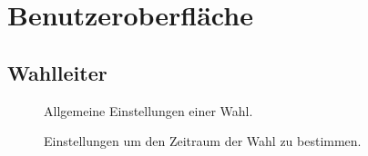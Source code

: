 \documentclass[parskip=full,11pt,twoside]{scrartcl}
\begin{document}
\section{Benutzeroberfläche}

\subsection{Wahlleiter}

\begin{figure}[hb]
	\caption{\label{fig:wlltr-general}
		Allgemeine Einstellungen einer Wahl.
	}
\end{figure}

\begin{figure}[hb]
	\caption{\label{fig:wlltr-time}
		Einstellungen um den Zeitraum der Wahl zu bestimmen.
	}
\end{figure}
\end{document}
